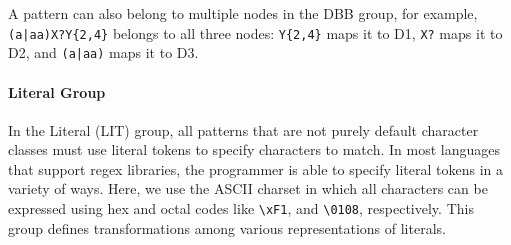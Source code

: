 \begin{description}

\end{description}

A pattern can also belong to multiple nodes in the DBB group, for example, \verb!(a|aa)X?Y{2,4}! belongs to all three nodes: \verb!Y{2,4}! maps it to D1, \verb!X?!  maps it to D2, and \verb!(a|aa)!  maps it to D3.




\paragraph{Literal Group}
In the Literal (LIT) group, all patterns that are not purely default character classes must use  literal tokens to specify  characters to match.  In  most  languages that support regex libraries, the programmer is able to specify literal tokens in a variety of ways.  Here, we use the ASCII charset in which all characters can be expressed using hex and octal codes like \verb!\xF1!, and \verb!\0108!, respectively.  This group defines transformations among various representations of literals.



